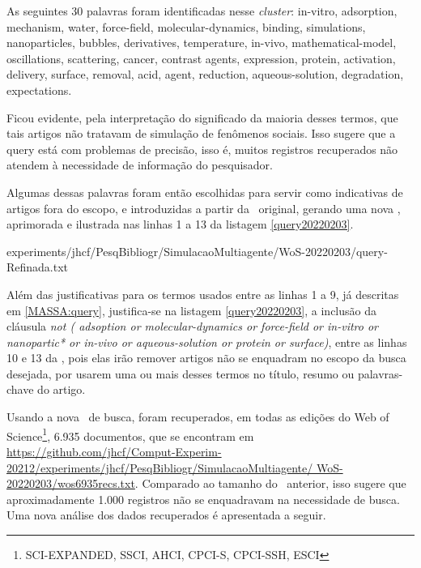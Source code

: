 As seguintes 30 palavras foram identificadas nesse \textit{cluster}:
in-vitro,
adsorption,
mechanism,
water,
force-field,
molecular-dynamics,
binding,
simulations,
nanoparticles,
bubbles,
derivatives,
temperature,
in-vivo,
mathematical-model,
oscillations,
scattering,
cancer,
contrast agents,
expression,
protein,
activation,
delivery,
surface,
removal,
acid,
agent,
reduction,
aqueous-solution,
degradation,
expectations.

Ficou evidente, pela interpretação do significado da maioria desses termos, que tais artigos não tratavam de simulação de fenômenos sociais. Isso sugere que a query está com problemas de precisão, isso é, muitos registros recuperados não atendem à necessidade de informação do pesquisador. 

Algumas dessas palavras foram então escolhidas para servir como indicativas de artigos fora do escopo, e introduzidas a partir da \query\  original, gerando uma nova \query, aprimorada e ilustrada nas linhas 1 a 13 da listagem \ref{query20220203}.


{experiments/jhcf/PesqBibliogr/SimulacaoMultiagente/WoS-20220203/query-Refinada.txt}

Além das justificativas para os termos usados entre as linhas 1 a 9, já descritas em \ref{MASSA:query},  justifica-se na listagem \ref{query20220203}, a inclusão da cláusula \textit{not (
 adsoption or molecular-dynamics or force-field
 or in-vitro or nanopartic* or in-vivo
 or aqueous-solution or protein or surface)}, entre as linhas 10 e 13 da \query, pois elas irão remover artigos não se enquadram no escopo da busca desejada, por usarem uma ou mais desses termos no título, resumo ou palavras-chave do artigo.
 
Usando a nova \query\ de busca, foram recuperados, em todas as edições do Web of Science\footnote{SCI-EXPANDED, SSCI, AHCI, CPCI-S, CPCI-SSH, ESCI}, 6.935 documentos, que se encontram em
\url{https://github.com/jhcf/Comput-Experim-20212/experiments/jhcf/PesqBibliogr/SimulacaoMultiagente/ WoS-20220203/wos6935recs.txt}. Comparado ao tamanho do \dataset\ anterior, isso sugere que aproximadamente 1.000 registros não se enquadravam na necessidade de busca.
Uma nova análise dos dados recuperados é apresentada a seguir.

